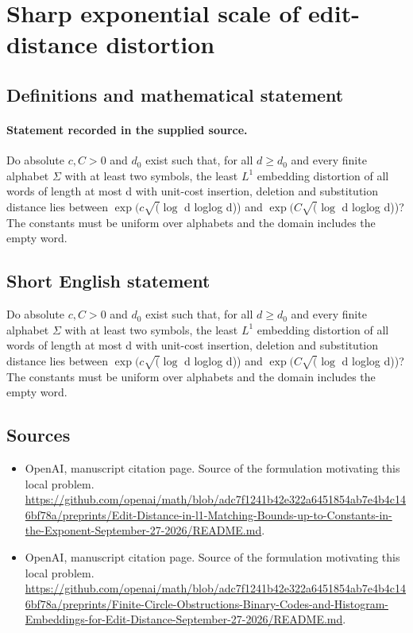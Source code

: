 \documentclass[11pt]{article}
\begin{document}
\section*{Sharp exponential scale of edit-distance distortion}\label{statement}
\subsection{Definitions and mathematical statement}
\paragraph{Statement recorded in the supplied source.}
Do absolute $c,C>0$ and $d_{0}$ exist such that, for all $d\geq d_{0}$ and every finite alphabet $\Sigma $ with at least two symbols, the least $L^{1}$ embedding distortion of all words of length at most d with unit-cost insertion, deletion and substitution distance lies between $\exp (c\surd (\log $ d loglog d)) and $\exp (C\surd (\log $ d loglog d))? The constants must be uniform over alphabets and the domain includes the empty word.
\subsection{Short English statement}
Do absolute $c,C>0$ and $d_{0}$ exist such that, for all $d\geq d_{0}$ and every finite alphabet $\Sigma $ with at least two symbols, the least $L^{1}$ embedding distortion of all words of length at most d with unit-cost insertion, deletion and substitution distance lies between $\exp (c\surd (\log $ d loglog d)) and $\exp (C\surd (\log $ d loglog d))? The constants must be uniform over alphabets and the domain includes the empty word.
\subsection{Sources}
\begin{itemize}
\item[S1] OpenAI, manuscript citation page. Source of the formulation motivating this local problem.
\url{https://github.com/openai/math/blob/adc7f1241b42e322a6451854ab7e4b4c146bf78a/preprints/Edit-Distance-in-l1-Matching-Bounds-up-to-Constants-in-the-Exponent-September-27-2026/README.md}.
\item[S2] OpenAI, manuscript citation page. Source of the formulation motivating this local problem.
\url{https://github.com/openai/math/blob/adc7f1241b42e322a6451854ab7e4b4c146bf78a/preprints/Finite-Circle-Obstructions-Binary-Codes-and-Histogram-Embeddings-for-Edit-Distance-September-27-2026/README.md}.
\end{itemize}
\end{document}
